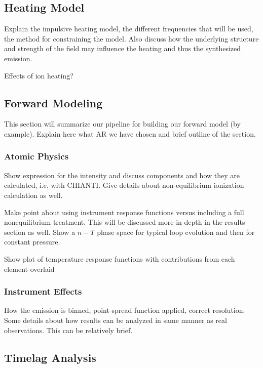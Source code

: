 \documentclass[modern,linenumbers]{aastex62}
\begin{document}
\subsection{Heating Model}
\label{heating}
Explain the impulsive heating model, the different frequencies that will be used, the method for constraining the model. Also discuss how the underlying structure and strength of the field may influence the heating and thus the synthesized emission.

Effects of ion heating?

\subsection{Forward Modeling}
\label{forward}
This section will summarize our pipeline for building our forward model (by example). Explain here what AR we have chosen and brief outline of the section.

\subsubsection{Atomic Physics}
\label{atomic}
Show expression for the intensity and discuss components and how they are calculated, i.e. with CHIANTI. Give details about non-equilibrium ionization calculation as well.

Make point about using instrument response functions versus including a full nonequilibrium treatment. This will be discussed more in depth in the results section as well. Show a $n-T$ phase space for typical loop evolution and then for constant pressure.

Show plot of temperature response functions with contributions from each element overlaid

\subsubsection{Instrument Effects}
\label{instrument}
How the emission is binned, point-spread function applied, correct resolution. Some details about how results can be analyzed in same manner as real observations. This can be relatively brief.

\subsection{Timelag Analysis}
\label{timelag_analysis}

\end{document}
